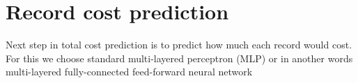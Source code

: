 
\section{Record cost prediction}

Next step in total cost prediction is to predict how much each record would cost. For this we choose standard multi-layered perceptron (MLP) or in another words multi-layered fully-connected feed-forward neural network